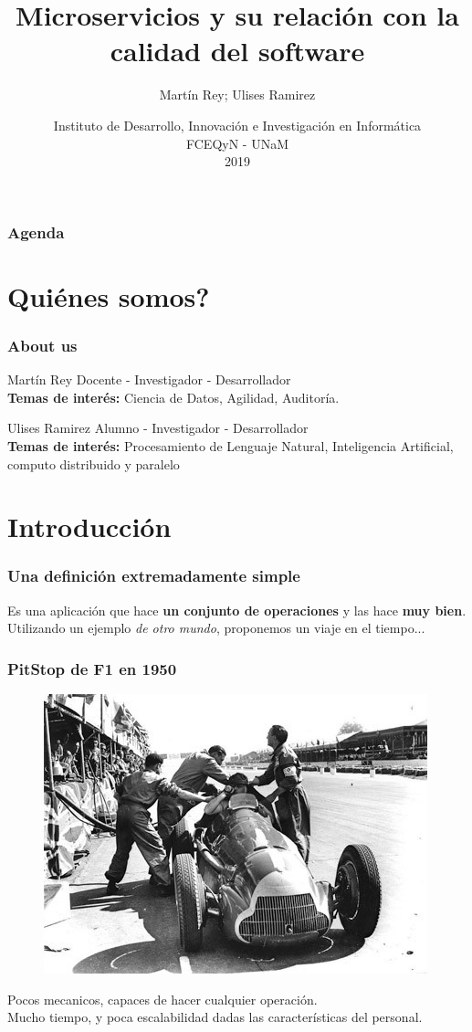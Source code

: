 \documentclass{beamer}
\title[]{Microservicios y su relación con la calidad del software}
\author[M. Rey, U. Ramirez]{Martín Rey; Ulises Ramirez}
\date[JCS UNaM 2019]{Instituto de Desarrollo, Innovación e Investigación en Informática \\ FCEQyN - UNaM \\ 2019}
\begin{document}
\frame{\titlepage}

\begin{frame}
    \frametitle{Agenda}
    \tableofcontents
\end{frame}

\section{Quiénes somos?}

\begin{frame}
    \frametitle{About us}
	\begin{block}{Martín Rey}
Docente - Investigador - Desarrollador \\
\textbf{Temas de interés:} Ciencia de Datos, Agilidad, Auditoría.
  	\end{block}

	\begin{block}{Ulises Ramirez}
Alumno - Investigador - Desarrollador \\
\textbf{Temas de interés:} Procesamiento de Lenguaje Natural, Inteligencia Artificial, computo distribuido y paralelo
  	\end{block}

\end{frame}

\section{Introducción}

\begin{frame}
	\frametitle{Una definición extremadamente simple}
	Es una aplicación que hace \textbf{un conjunto de operaciones} y las hace \textbf{muy bien}. \\
	Utilizando un ejemplo \emph{de otro mundo}, proponemos un viaje en el tiempo...\\
\end{frame}

\begin{frame}
	\frametitle{PitStop de F1 en 1950}
	\begin{figure}[htp]
	\centering
	\includegraphics[scale=0.4]{img/f1-antes.jpeg}
	\end{figure}

	Pocos mecanicos, capaces de hacer cualquier operación. \\
	Mucho tiempo, y poca escalabilidad dadas las características del personal.
\end{frame}
\end{document}
